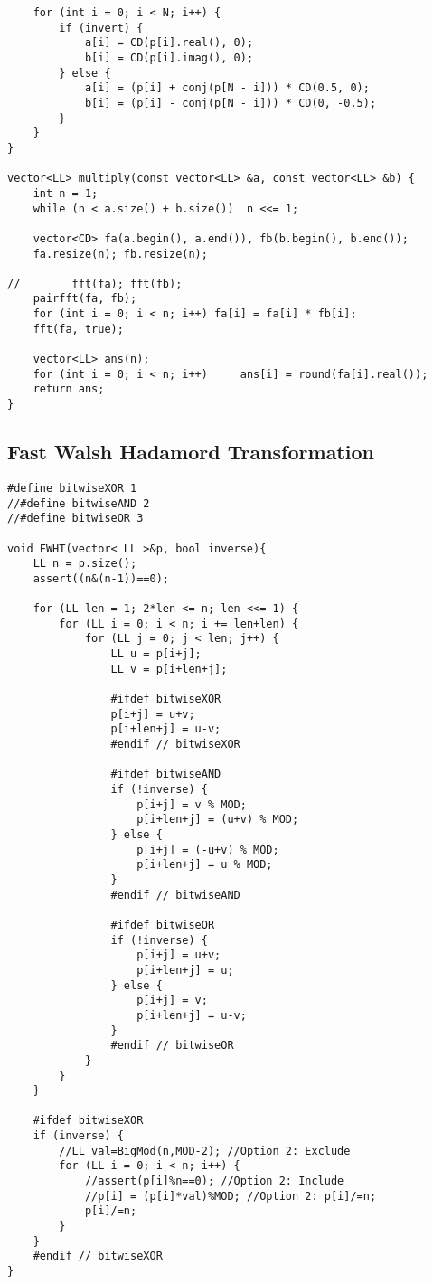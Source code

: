 \documentclass[10pt,a4paper,onesided]{article}
\begin{document}
\begin{multicols*}{3}
\begin{lstlisting}
    for (int i = 0; i < N; i++) {
        if (invert) {
            a[i] = CD(p[i].real(), 0);
            b[i] = CD(p[i].imag(), 0);
        } else {
            a[i] = (p[i] + conj(p[N - i])) * CD(0.5, 0);
            b[i] = (p[i] - conj(p[N - i])) * CD(0, -0.5);
        }
    }
}

vector<LL> multiply(const vector<LL> &a, const vector<LL> &b) {
    int n = 1;
    while (n < a.size() + b.size())  n <<= 1;

    vector<CD> fa(a.begin(), a.end()), fb(b.begin(), b.end());
    fa.resize(n); fb.resize(n);

//        fft(fa); fft(fb);
    pairfft(fa, fb);
    for (int i = 0; i < n; i++) fa[i] = fa[i] * fb[i];
    fft(fa, true);

    vector<LL> ans(n);
    for (int i = 0; i < n; i++)     ans[i] = round(fa[i].real());
    return ans;
}\end{lstlisting}
\subsection{Fast Walsh Hadamord Transformation}
\begin{lstlisting}
#define bitwiseXOR 1
//#define bitwiseAND 2
//#define bitwiseOR 3

void FWHT(vector< LL >&p, bool inverse){
    LL n = p.size();
    assert((n&(n-1))==0);

    for (LL len = 1; 2*len <= n; len <<= 1) {
        for (LL i = 0; i < n; i += len+len) {
            for (LL j = 0; j < len; j++) {
                LL u = p[i+j];
                LL v = p[i+len+j];

                #ifdef bitwiseXOR
                p[i+j] = u+v;
                p[i+len+j] = u-v;
                #endif // bitwiseXOR

                #ifdef bitwiseAND
                if (!inverse) {
                    p[i+j] = v % MOD;
                    p[i+len+j] = (u+v) % MOD;
                } else {
                    p[i+j] = (-u+v) % MOD;
                    p[i+len+j] = u % MOD;
                }
                #endif // bitwiseAND

                #ifdef bitwiseOR
                if (!inverse) {
                    p[i+j] = u+v;
                    p[i+len+j] = u;
                } else {
                    p[i+j] = v;
                    p[i+len+j] = u-v;
                }
                #endif // bitwiseOR
            }
        }
    }

    #ifdef bitwiseXOR
    if (inverse) {
        //LL val=BigMod(n,MOD-2); //Option 2: Exclude
        for (LL i = 0; i < n; i++) {
            //assert(p[i]%n==0); //Option 2: Include
            //p[i] = (p[i]*val)%MOD; //Option 2: p[i]/=n;
            p[i]/=n;
        }
    }
    #endif // bitwiseXOR
}


\end{lstlisting}
\end{multicols*}
\end{document}
